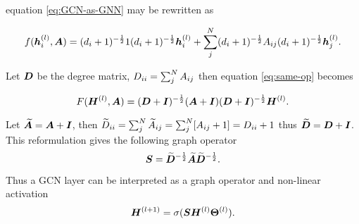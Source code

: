 
equation \ref{eq:GCN-as-GNN} may be rewritten as

\begin{equation}
    \label{eq:same-op}
    f({\bm{h}}_i^{(l)}, {\bm{A}}) = (d_i + 1)^{-\frac12}1(d_i + 1)^{-\frac12}{\bm{h}}_i^{(l)} + \sum_j^N(d_i + 1)^{-\frac12}{A}_{ij}(d_i + 1)^{-\frac12}{\bm{h}}_j^{(l)}.
\end{equation}

Let ${\bm{D}}$ be the degree matrix, ${D}_{ii} = \sum_j^N {A}_{ij}$ then
equation \ref{eq:same-op} becomes

\begin{equation}
    F({\bm{H}}^{(l)}, {\bm{A}}) = ({\bm{D}} + {\bm{I}})^{-\frac12}({\bm{A}} + {\bm{I}})({\bm{D}} + {\bm{I}})^{-\frac12}{\bm{H}}^{(l)}.
\end{equation}

Let $\widetilde{{\bm{A}}} = {\bm{A}} + {\bm{I}}$, then $\widetilde{{D}}_{ii} = \sum_j^N \widetilde{{A}}_{ij} = \sum_j^N [{A}_{ij} + 1] = {D}_{ii} + 1$ thus $\widetilde{{\bm{D}}} = {\bm{D}} + {\bm{I}}$.
This reformulation gives the following graph operator 
\begin{equation}
    \label{eq:op}
    {\bm{S}} = \widetilde{{\bm{D}}}^{-\frac12}\widetilde{{\bm{A}}}\widetilde{{\bm{D}}}^{-\frac12}.
\end{equation}

Thus a GCN layer can be interpreted as a graph operator and non-linear activation
\begin{equation}
    \label{eq:GCN1}
    {\bm{H}}^{(l+1)} = \sigma({\bm{S}}{\bm{H}}^{(l)}\bm{\Theta}^{(l)}).
\end{equation}


